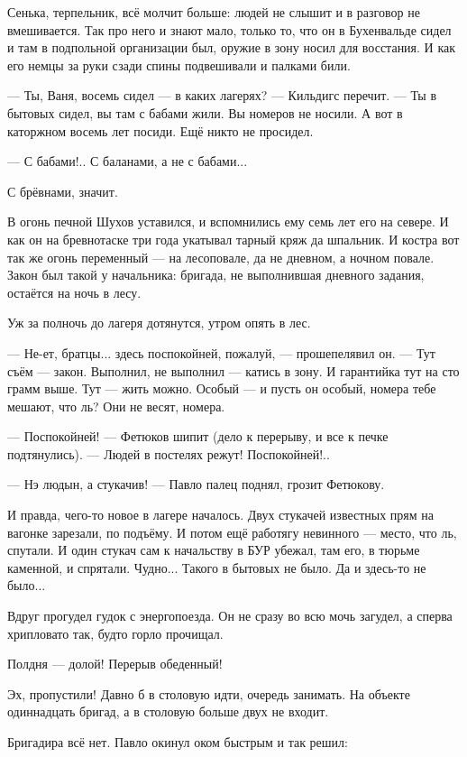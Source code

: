Сенька, терпельник, всё молчит больше: людей не слышит и в разговор не вмешивается. Так про
него и знают мало, только то, что он в Бухенвальде сидел и там в подпольной организации был,
оружие в зону носил для восстания. И как его немцы за руки сзади спины подвешивали и палками
били.

--- Ты, Ваня, восемь сидел --- в каких лагерях? --- Кильдигс перечит. --- Ты в бытовых сидел, вы там с
бабами жили. Вы номеров не носили. А вот в каторжном восемь лет посиди. Ещё никто не просидел.

--- С бабами!.. С баланами, а не с бабами...

С брёвнами, значит.

В огонь печной Шухов уставился, и вспомнились ему семь лет его на севере. И как он на
бревнотаске три года укатывал тарный кряж да шпальник. И костра вот так же огонь переменный
--- на лесоповале, да не дневном, а ночном повале. Закон был такой у начальника: бригада, не
выполнившая дневного задания, остаётся на ночь в лесу.

Уж за полночь до лагеря дотянутся, утром опять в лес.

--- Не-ет, братцы... здесь поспокойней, пожалуй, --- прошепелявил он. --- Тут съём --- закон.
Выполнил, не выполнил --- катись в зону. И гарантийка тут на сто грамм выше. Тут --- жить можно.
Особый --- и пусть он особый, номера тебе мешают, что ль? Они не весят, номера.

--- Поспокойней! --- Фетюков шипит (дело к перерыву, и все к печке подтянулись). --- Людей в
постелях режут! Поспокойней!..

--- Нэ людын, а стукачив! --- Павло палец поднял, грозит Фетюкову.

И правда, чего-то новое в лагере началось. Двух стукачей известных прям на вагонке зарезали,
по подъёму. И потом ещё работягу невинного --- место, что ль, спутали. И один стукач сам к
начальству в БУР убежал, там его, в тюрьме каменной, и спрятали. Чудно... Такого в бытовых не
было. Да и здесь-то не было...

Вдруг прогудел гудок с энергопоезда. Он не сразу во всю мочь загудел, а сперва хрипловато
так, будто горло прочищал.

Полдня --- долой! Перерыв обеденный!

Эх, пропустили! Давно б в столовую идти, очередь занимать. На объекте одиннадцать бригад, а в
столовую больше двух не входит.

Бригадира всё нет. Павло окинул оком быстрым и так решил:

